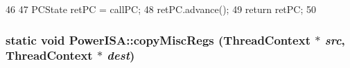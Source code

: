 \begin{DoxyCode}
46 {
47     PCState retPC = callPC;
48     retPC.advance();
49     return retPC;
50 }
\end{DoxyCode}
\hypertarget{namespacePowerISA_a3f858968468b53a25f80248755f51083}{
\subsubsection[{copyMiscRegs}]{\setlength{\rightskip}{0pt plus 5cm}static void PowerISA::copyMiscRegs ({\bf ThreadContext} $\ast$ {\em src}, \/  {\bf ThreadContext} $\ast$ {\em dest})}}
\label{namespacePowerISA_a3f858968468b53a25f80248755f51083}



